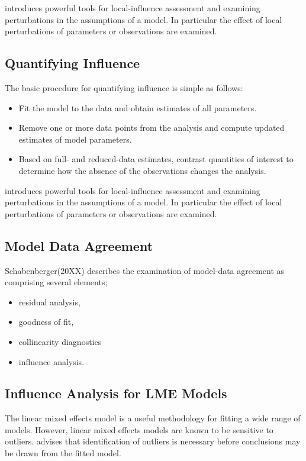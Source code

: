 \documentclass[12pt, a4paper]{article}
\begin{document}
			\citet{cook86} introduces powerful tools for local-influence assessment and examining perturbations in the assumptions of a model. In particular the effect of local perturbations of parameters or observations are examined.
			
			
			\newpage
			
			\subsection{Quantifying Influence}  %
			The basic procedure for quantifying influence is simple as follows:
			
			\begin{itemize}
				\item Fit the model to the data and obtain estimates of all parameters.
				\item Remove one or more data points from the analysis and compute updated estimates of model parameters.
				\item Based on full- and reduced-data estimates, contrast quantities of interest to determine how the absence of the observations changes the analysis.
			\end{itemize}
			
			\citet{cook86} introduces powerful tools for local-influence assessment and examining perturbations in the assumptions of a model. In particular the effect of local perturbations of parameters or observations are examined.
			
			
			\subsection{Model Data Agreement}
			Schabenberger(20XX) describes the examination of model-data agreement as comprising several elements; \begin{itemize}
				\item residual analysis, 
				\item goodness of fit, 
				\item collinearity diagnostics
				\item influence analysis.
			\end{itemize}
			\subsection{Influence Analysis for LME Models} %
			The linear mixed effects model is a useful methodology for fitting a wide range of models. However, linear mixed effects models are known to be sensitive to outliers. \citet{CPJ} advises that identification of outliers is necessary before conclusions may be drawn from the fitted model.
			
\end{document}
